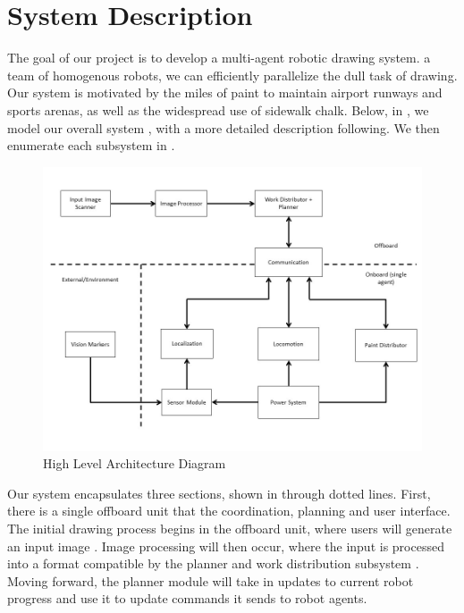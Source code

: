 
\section{System Description}
\label{sec:system_description}

The goal of our project is to develop a multi-agent robotic drawing system.  a team of homogenous robots, we can efficiently parallelize the dull task of drawing. Our system is motivated by the miles of paint  to maintain airport runways and sports arenas, as well as the widespread use of sidewalk chalk. Below, in , we model our overall system , with a more detailed description following. We then enumerate each subsystem in .

\begin{figure}[h!]
 \centering
  \includegraphics[width=0.90\columnwidth]{diagrams/systems_diagram.jpg}
	\caption{High Level Architecture Diagram}
 \label{fig:system_description}
\end{figure}

Our system encapsulates three sections, shown in  through dotted lines. First, there is a single offboard unit that  the coordination, planning and user interface. The initial drawing process begins in the offboard unit, where users will generate an input image
. Image processing will then occur, where the input is processed into a format compatible by the planner and work distribution subsystem . Moving forward, the planner module will take in updates to current robot progress and use it to update commands it sends to robot agents.

